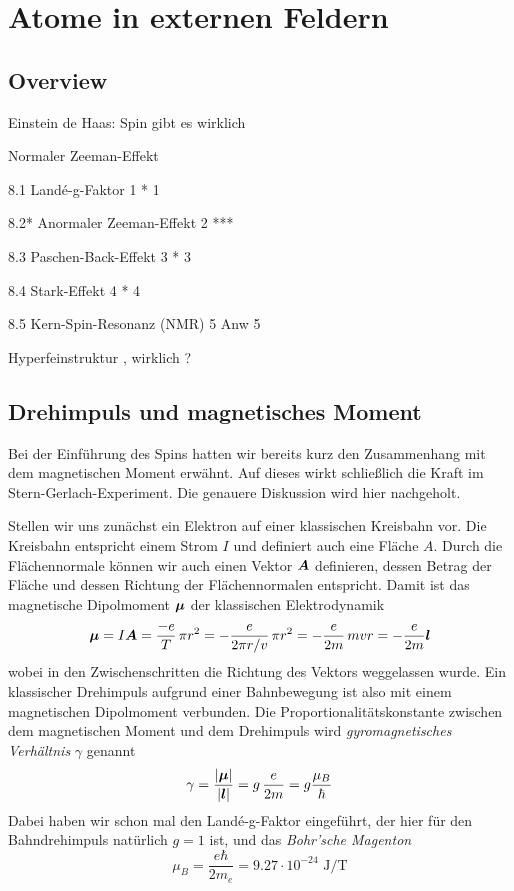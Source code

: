 \renewcommand{\lastmod}{29. November 2024}
\renewcommand{\chapterauthors}{Markus Lippitz}

\chapter{Atome in externen Feldern}






\section{Overview}

Einstein de Haas: Spin gibt es wirklich

Normaler Zeeman-Effekt

8.1 Landé-g-Faktor 1	*	1 

8.2* Anormaler Zeeman-Effekt 2	***

8.3 Paschen-Back-Effekt 3	*	3 

8.4 Stark-Effekt 4	*	4 

8.5 Kern-Spin-Resonanz (NMR) 5	Anw	5 

Hyperfeinstruktur , wirklich ?



\section{Drehimpuls und magnetisches Moment}

Bei der Einführung des Spins hatten wir bereits kurz den Zusammenhang mit dem magnetischen Moment erwähnt. Auf dieses wirkt schließlich die Kraft im Stern-Gerlach-Experiment. Die genauere Diskussion wird hier nachgeholt.

Stellen wir uns zunächst ein Elektron auf einer klassischen Kreisbahn vor. Die Kreisbahn entspricht einem Strom $I$ und definiert auch eine Fläche $A$. Durch die Flächennormale können wir auch einen Vektor $\boldsymbol{A}$ definieren, dessen Betrag der Fläche und dessen Richtung der Flächennormalen entspricht. Damit ist das magnetische Dipolmoment $\boldsymbol{\mu}$ der klassischen Elektrodynamik 
\begin{equation}
    \boldsymbol{\mu} = I \boldsymbol{A} = \frac{-e}{T} \, \pi r^2 = - \frac{e}{2\pi r/v} \, \pi r^2 
= -\frac{e}{2m} \, m v r = - \frac{e}{2m} \boldsymbol{l}
\end{equation}
wobei in den Zwischenschritten die Richtung des Vektors weggelassen wurde. Ein klassischer Drehimpuls aufgrund einer Bahnbewegung ist also mit einem magnetischen Dipolmoment verbunden. Die Proportionalitätskonstante zwischen dem magnetischen Moment und dem Drehimpuls wird \emph{gyromagnetisches Verhältnis} $\gamma$ genannt
\begin{equation}
    \gamma  = \frac{|\boldsymbol{\mu}|}{|\boldsymbol{l}|} = g \, \frac{e}{2m} = g \frac{\mu_B}{\hbar}
\end{equation}
Dabei haben wir schon mal den Landé-g-Faktor eingeführt, der hier für den Bahndrehimpuls natürlich $g=1$ ist, und das \emph{Bohr'sche Magenton} 
\begin{equation}
\mu_B = \frac{e \hbar}{2 m_e} = 9.27 \cdot 10^{-24} \text{ J/T}    
\end{equation}



